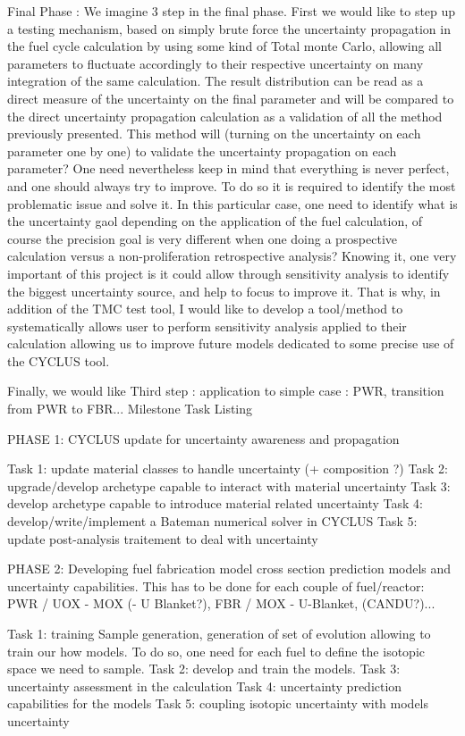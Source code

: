 \documentclass[dvips,12pt]{article}
\begin{document}
Final Phase :
We imagine 3 step in the final phase. First we would like to step up a testing mechanism, based on simply brute force the uncertainty propagation in the fuel cycle calculation by using some kind of Total monte Carlo, allowing all parameters to fluctuate accordingly to their respective uncertainty on many integration of the same calculation. The result distribution can be read as a direct measure of the uncertainty on the final parameter and will be compared to the direct uncertainty propagation calculation as a validation of all the method previously presented. This method will (turning on the uncertainty on each parameter one by one) to validate the uncertainty propagation on each parameter?
One need nevertheless keep in mind that everything is never perfect, and one should always try to improve. To do so it is required to identify the most problematic issue and solve it. In this particular case, one need to identify what is the uncertainty gaol depending on the application of the fuel calculation, of course the precision goal is very different when one doing a prospective calculation versus a non-proliferation retrospective analysis? Knowing it, one very important of this project is it could allow through sensitivity analysis to identify the biggest uncertainty source, and help to focus to improve it.
That is why, in addition of the TMC test tool, I would like to develop a tool/method to systematically allows user to perform sensitivity analysis applied to their calculation allowing us to improve future models dedicated to some precise use of the CYCLUS tool.


Finally, we would like
Third step : application to simple case : PWR, transition from PWR to FBR...
Milestone Task Listing

PHASE 1: CYCLUS update for uncertainty awareness and propagation

Task 1: update material classes to handle uncertainty (+ composition ?)
Task 2: upgrade/develop archetype capable to interact with material uncertainty
Task 3: develop archetype capable to introduce material related uncertainty
Task 4: develop/write/implement a Bateman numerical solver in CYCLUS
Task 5: update post-analysis traitement to deal with uncertainty  
 
PHASE 2: Developing fuel fabrication model cross section prediction models and uncertainty capabilities. This has to be done for each couple of fuel/reactor: PWR / UOX - MOX (- U Blanket?), FBR / MOX - U-Blanket, (CANDU?)...

Task 1: training Sample generation, generation of set of evolution allowing to train our how models.
To do so, one need for each fuel to define the isotopic space we need to sample. 
Task 2: develop and train the models.
Task 3: uncertainty assessment in the calculation
Task 4: uncertainty prediction capabilities for the models
Task 5: coupling isotopic uncertainty with models uncertainty
\end{document}
